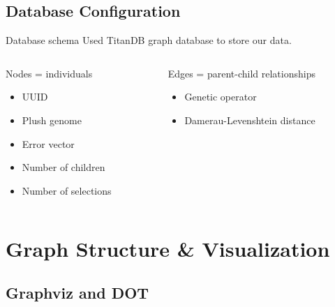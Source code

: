 \documentclass{beamer}
\begin{document}
\subsection{Database Configuration}
\begin{frame}{Database schema}
Used TitanDB graph database to store our data.
\vspace{.5cm}
\begin{columns}
\begin{column}{0.45\textwidth}
Nodes = individuals
	\begin{itemize}
    	\setlength\itemsep{.5em}
		\item UUID
		\item Plush genome
		\item Error vector
		\item Number of children
		\item Number of selections
	\end{itemize}
\end{column}
\begin{column}{0.5\textwidth}
Edges = parent-child relationships
	\begin{itemize}
    	\setlength\itemsep{.5em}
		\item Genetic operator
		\item Damerau-Levenshtein distance
	\end{itemize}
    \vspace{2cm} %
\end{column}
\end{columns}
\end{frame}


\section{Graph Structure \& Visualization}

\subsection{Graphviz and DOT}
\end{document}
